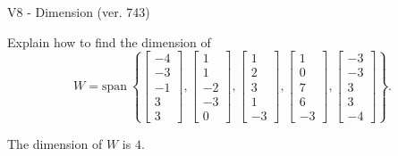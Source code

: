 \begin{exercise}
  \begin{exerciseTitle}V8 - Dimension (ver. 743)\end{exerciseTitle}
  \begin{exerciseStatement}
    Explain how to find the dimension of 
\[W=\mathrm{span}\ \left\{\left[\begin{array}{r}
-4 \\
-3 \\
-1 \\
3 \\
3
\end{array}\right] , \left[\begin{array}{r}
1 \\
1 \\
-2 \\
-3 \\
0
\end{array}\right] , \left[\begin{array}{r}
1 \\
2 \\
3 \\
1 \\
-3
\end{array}\right] , \left[\begin{array}{r}
1 \\
0 \\
7 \\
6 \\
-3
\end{array}\right] , \left[\begin{array}{r}
-3 \\
-3 \\
3 \\
3 \\
-4
\end{array}\right]\right\}.\]



  \end{exerciseStatement}
  \begin{exerciseAnswer}
   The dimension of \(W\) is  \(4\).
  


  \end{exerciseAnswer}
\end{exercise}